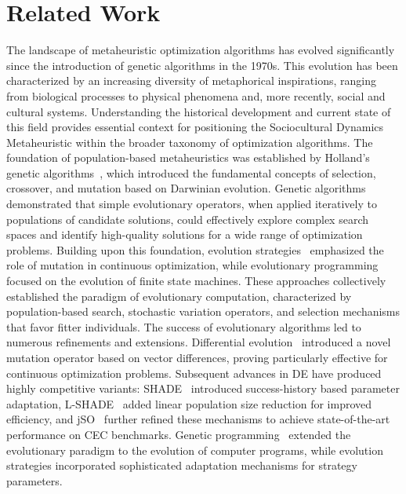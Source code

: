 \documentclass[11pt]{article}
\begin{document}
\section{Related Work}
\label{sec:related}

The landscape of metaheuristic optimization algorithms has evolved significantly since the introduction of genetic algorithms in the 1970s. This evolution has been characterized by an increasing diversity of metaphorical inspirations, ranging from biological processes to physical phenomena and, more recently, social and cultural systems. Understanding the historical development and current state of this field provides essential context for positioning the Sociocultural Dynamics Metaheuristic within the broader taxonomy of optimization algorithms.
The foundation of population-based metaheuristics was established by Holland's genetic algorithms~\citep{holland1992adaptation}, which introduced the fundamental concepts of selection, crossover, and mutation based on Darwinian evolution. Genetic algorithms demonstrated that simple evolutionary operators, when applied iteratively to populations of candidate solutions, could effectively explore complex search spaces and identify high-quality solutions for a wide range of optimization problems.
Building upon this foundation, evolution strategies~\citep{rechenberg1973evolutionsstrategie} emphasized the role of mutation in continuous optimization, while evolutionary programming~\citep{fogel1966artificial} focused on the evolution of finite state machines. These approaches collectively established the paradigm of evolutionary computation, characterized by population-based search, stochastic variation operators, and selection mechanisms that favor fitter individuals.
The success of evolutionary algorithms led to numerous refinements and extensions. Differential evolution~\citep{storn1997differential} introduced a novel mutation operator based on vector differences, proving particularly effective for continuous optimization problems. Subsequent advances in DE have produced highly competitive variants: SHADE~\citep{tanabe2013shade} introduced success-history based parameter adaptation, L-SHADE~\citep{tanabe2014lshade} added linear population size reduction for improved efficiency, and jSO~\citep{brest2017jso} further refined these mechanisms to achieve state-of-the-art performance on CEC benchmarks. Genetic programming~\citep{koza1992genetic} extended the evolutionary paradigm to the evolution of computer programs, while evolution strategies incorporated sophisticated adaptation mechanisms for strategy parameters.
\end{document}
